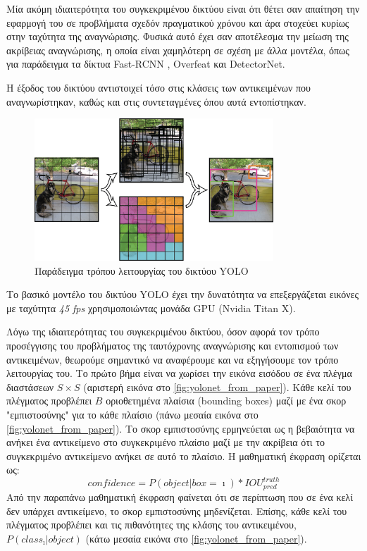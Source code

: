 Μία ακόμη ιδιαιτερότητα του συγκεκριμένου δικτύου είναι ότι θέτει σαν απαίτηση
την εφαρμογή του σε προβλήματα σχεδόν πραγματικού χρόνου και άρα στοχεύει κυρίως
στην ταχύτητα της αναγνώρισης. Φυσικά αυτό έχει σαν αποτέλεσμα την μείωση της ακρίβειας
αναγνώρισης, η οποία είναι χαμηλότερη σε σχέση με άλλα μοντέλα, όπως για παράδειγμα τα δίκτυα
Fast-RCNN \cite{DBLP:journals/corr/Girshick15}, Overfeat και DetectorNet.

Η έξοδος του δικτύου αντιστοιχεί τόσο στις κλάσεις των αντικειμένων
που αναγνωρίστηκαν, καθώς και στις συντεταγμένες όπου αυτά εντοπίστηκαν.

\begin{figure}[!ht]
  \centering
  \includegraphics[width=0.8\textwidth]{./images/chapter5/yolonet_from_paper_1.png}
  \caption[Παράδειγμα τρόπου λειτουργίας του δικτύου YOLO]{Παράδειγμα τρόπου λειτουργίας του δικτύου YOLO}
  \label{fig:yolonet_from_paper}
\end{figure}

Το βασικό μοντέλο του δικτύου YOLO έχει την δυνατότητα να επεξεργάζεται εικόνες με ταχύτητα
\emph{45 fps} χρησιμοποιώντας μονάδα GPU (Nvidia Titan X).

Λόγω της ιδιαιτερότητας του συγκεκριμένου δικτύου, όσον αφορά τον τρόπο προσέγγισης του προβλήματος της ταυτόχρονης
αναγνώρισης και εντοπισμού των αντικειμένων, θεωρούμε σημαντικό να αναφέρουμε
και να εξηγήσουμε τον τρόπο λειτουργίας του.
Το πρώτο βήμα είναι να χωρίσει την εικόνα εισόδου σε ένα πλέγμα διαστάσεων $S \times S$
(αριστερή εικόνα στο \autoref{fig:yolonet_from_paper}).
Κάθε κελί του πλέγματος προβλέπει $B$ οριοθετημένα πλαίσια (bounding boxes) μαζί με ένα σκορ
"εμπιστοσύνης" για το κάθε πλαίσιο (πάνω μεσαία εικόνα στο \autoref{fig:yolonet_from_paper}).
Το σκορ εμπιστοσύνης ερμηνεύεται ως η βεβαιότητα
να ανήκει ένα αντικείμενο στο συγκεκριμένο πλαίσιο μαζί με την ακρίβεια ότι
το συγκεκριμένο αντικείμενο ανήκει σε αυτό το πλαίσιο. Η μαθηματική έκφραση
ορίζεται ως:
\begin{equation*}
  confidence = P(object | box = \imath) * IOU_{pred}^{truth}
\end{equation*}
Από την παραπάνω μαθηματική έκφραση φαίνεται ότι σε περίπτωση που
σε ένα κελί δεν υπάρχει αντικείμενο, το σκορ εμπιστοσύνης μηδενίζεται.
Επίσης, κάθε κελί του πλέγματος προβλέπει και τις πιθανότητες της κλάσης
του αντικειμένου, $P(class_{\imath} | object)$
(κάτω μεσαία εικόνα στο \autoref{fig:yolonet_from_paper}).

